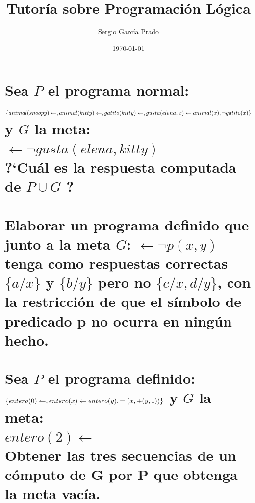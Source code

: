 \documentclass[11pt, a4paper,spanish]{article}
\title{\vspace{-15mm}\fontsize{24.88pt}{10pt}\textbf{Tutoría sobre Programación Lógica}} %
\author{Sergio García Prado}
\date{\today}
\begin{document}
	\maketitle %

	\thispagestyle{fancy} %


	\section{Sea $P$ el programa normal: \\
		$\{animal(snoopy) \gets, \\
		animal(kitty) \gets, \\
		gatito(kitty) \gets, \\
		gusta(elena,x) \gets animal(x), \neg gatito(x)\}\\$
		y $G$ la meta: \\
		$\gets \neg gusta(elena,kitty)$\\
		?`Cuál es la respuesta computada de $P \cup {G}$ ?}

		\paragraph{}


	\section{Elaborar un programa definido que junto a la meta $G$: $\gets \neg p(x,y)$ tenga como respuestas correctas $\{ a / x \}$ y $\{b / y\}$ pero no $\{c / x, d / y\}$, con la restricción de que el símbolo de predicado p no ocurra en ningún hecho.}

		\paragraph{}

	\clearpage
	\section{Sea $P$ el programa definido: \\
		$\{entero(0) \gets ,\\
		entero(x) \gets entero(y), =(x, +(y,1))\}\\$
		y $G$ la meta: \\
		$entero(2) \gets$\\
		Obtener las tres secuencias de un cómputo de G por P que obtenga la meta vacía.}
\end{document}
